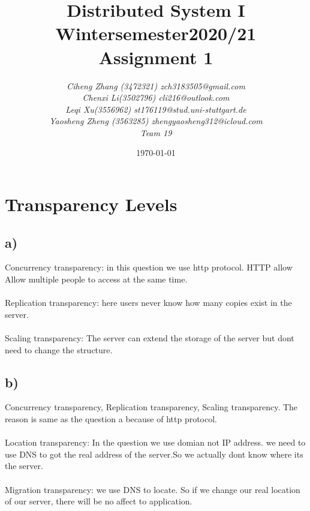\documentclass{article}
\begin{document}
\begin{titlepage}
    \title{\Huge \textbf{Distributed System I\\Wintersemester2020/21\\Assignment 1} }
    \author{\LARGE \textsl{Ciheng Zhang (3472321) zch3183505@gmail.com}\\\LARGE \textsl{Chenxi Li(3502796) cli216@outlook.com }\\\LARGE \textsl{Leqi Xu(3556962) st176119@stud.uni-stuttgart.de} \\\LARGE \textsl{Yaosheng Zheng (3563285) zhengyaosheng312@icloud.com}\\\LARGE \textsl{Team 19 } \\[200pt]}
    \date{\today}
    \maketitle
    \thispagestyle{empty}
\end{titlepage}
\newpage
\section*{Transparency Levels}
\subsection*{a)}
Concurrency transparency: in this question we use http protocol. HTTP allow Allow multiple people to access at the same time.\\
\\Replication transparency: here users never know how many copies exist in the server.\\
\\Scaling transparency: The server can extend the storage of the server but dont need to change the structure.
\subsection*{b)}
Concurrency transparency, Replication transparency, Scaling transparency. The reason is same as the question a because of http protocol.
\\
\\Location transparency: In the question we use domian not IP address. we need to use DNS to got the real address of the server.So we actually dont know where its the server.\\
\\Migration transparency: we use DNS to locate. So if we change our real location of our server, there will be no affect to application.
\end{document}
